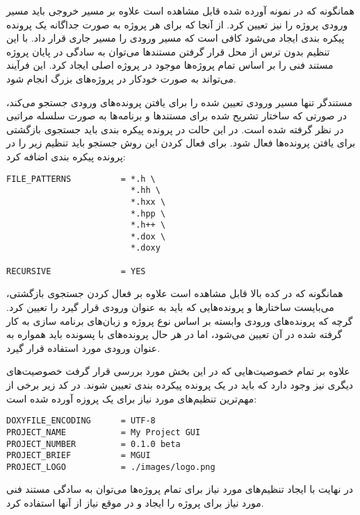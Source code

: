همانگونه که در نمونه آورده شده قابل مشاهده است علاوه بر مسیر خروجی باید مسیر
ورودی پروژه را نیز تعیین کرد. از آنجا که برای هر پروژه به صورت جداگانه یک پرونده
پیکره بندی ایجاد می‌شود کافی است که مسیر ورودی را مسیر جاری قرار داد. با این
تنظیم بدون ترس از محل قرار گرفتن مستند‌ها می‌توان به سادگی در پایان پروژه مستند
فنی را بر اساس تمام پروژه‌ها موجود در پروژه اصلی ایجاد کرد. این فرآیند می‌تواند
به صورت خودکار در پروژه‌های بزرگ انجام شود.

مستندگر  تنها مسیر ورودی تعیین شده را برای یافتن پرونده‌های ورودی
جستجو می‌کند، در صورتی که ساختار تشریح شده برای مستندها و برنامه‌ها به صورت
سلسله مراتبی در نظر گرفته شده است. در این حالت در پرونده پیکره بندی باید جستجوی
بازگشتی برای یافتن پرونده‌ها فعال شود. برای فعال کردن این روش جستجو باید تنظیم
زیر را در پرونده پیکره بندی اضافه کرد:

\begin{latin}
\lstset{language=bash}  
\begin{lstlisting}[frame=single] 
FILE_PATTERNS          = *.h \
                         *.hh \
                         *.hxx \
                         *.hpp \
                         *.h++ \
                         *.dox \
                         *.doxy

RECURSIVE              = YES
\end{lstlisting}
\end{latin}

همانگونه که در کده بالا قابل مشاهده است علاوه بر فعال کردن جستجوی بازگشتی،
می‌بایست ساختارها و پرونده‌هایی که باید به عنوان ورودی قرار گیرد را تعیین کرد.
گرچه که پرونده‌های ورودی وابسته بر اساس نوع پروژه و زبان‌های برنامه سازی به کار
گرفته شده در آن تعیین می‌شود، اما در هر حال پرونده‌های با پسونده 
باید همواره به عنوان ورودی مورد استفاده قرار گیرد.

علاوه بر تمام خصوصیت‌هایی که در این بخش مورد بررسی قرار گرفت خصوصیت‌های دیگری
نیز وجود دارد که باید در یک پرونده پیکرده بندی تعیین شوند. در کد زیر  برخی از
مهم‌ترین تنظیم‌های مورد نیاز برای یک پروزه آورده شده است:

\begin{latin}
\lstset{language=bash}  
\begin{lstlisting}[frame=single] 
DOXYFILE_ENCODING      = UTF-8
PROJECT_NAME           = My Project GUI
PROJECT_NUMBER         = 0.1.0 beta
PROJECT_BRIEF          = MGUI
PROJECT_LOGO           = ./images/logo.png
\end{lstlisting}
\end{latin}

در نهایت با ایجاد تنظیم‌های مورد نیاز برای تمام پروژه‌ها می‌توان به سادگی مستند
فنی مورد نیاز برای پروژه را ایجاد و در موقع نیاز از آنها استفاده کرد.
